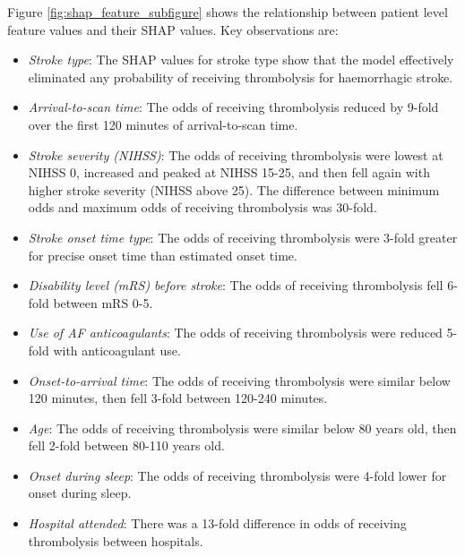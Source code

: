 \begin{minipage}{1\textwidth}
Figure \ref{fig:shap_feature_subfigure} shows the relationship between patient level feature values and their SHAP values. Key observations are:

\begin{itemize}
    \item \emph{Stroke type}: The SHAP values for stroke type show that the model effectively eliminated any probability of receiving thrombolysis for haemorrhagic stroke.
    \item \emph{Arrival-to-scan time}: The odds of receiving thrombolysis reduced by 9-fold over the first 120 minutes of arrival-to-scan time.
    \item \emph{Stroke severity (NIHSS)}: The odds of receiving thrombolysis were lowest at NIHSS 0, increased and peaked at NIHSS 15-25, and then fell again with higher stroke severity (NIHSS above 25). The difference between minimum odds and maximum odds of receiving thrombolysis was 30-fold.
    \item \emph{Stroke onset time type}: The odds of receiving thrombolysis were 3-fold greater for precise onset time than estimated onset time.
    \item \emph{Disability level (mRS) before stroke}: The odds of receiving thrombolysis fell 6-fold between mRS 0-5.
    \item \emph{Use of AF anticoagulants}: The odds of receiving thrombolysis were reduced 5-fold with anticoagulant use.
    \item \emph{Onset-to-arrival time}: The odds of receiving thrombolysis were similar below 120 minutes, then fell 3-fold between 120-240 minutes.
    \item \emph{Age}: The odds of receiving thrombolysis were similar below 80 years old, then fell 2-fold between 80-110 years old.    
    \item \emph{Onset during sleep}: The odds of receiving thrombolysis were 4-fold lower for onset during sleep.
    \item \emph{Hospital attended}: There was a 13-fold difference in odds of receiving thrombolysis between hospitals.
\end{itemize}
\end{minipage}


